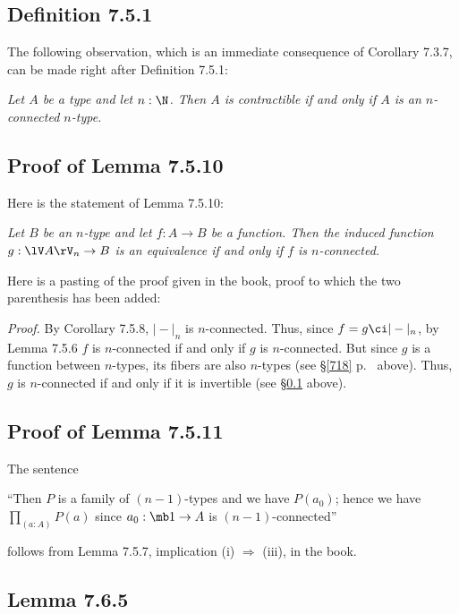 \documentclass[12pt]{article}
\begin{document}

\subsection{Definition 7.5.1}\label{751}

The following observation, which is an immediate consequence of Corollary 7.3.7, can be made right after Definition 7.5.1:

\nn\emph{Let $A$ be a type and let $n:\N$. Then $A$ is contractible if and only if $A$ is an $n$-connected $n$-type.}


\subsection{Proof of Lemma 7.5.10}

Here is the statement of Lemma 7.5.10:

\nn{} \emph{Let $B$ be an $n$-type and let $f:A\to B$ be a function. Then the induced function $g:\lV A\rV_n\to B$ is an equivalence if and only if $f$ is $n$-connected.}

Here is a pasting of the proof given in the book, proof to which the two parenthesis has been added: 

\nn\emph{Proof.} By Corollary 7.5.8, $\vert-\vert_n$ is $n$-connected. Thus, since $f=g\ci\vert-\vert_n$, by Lemma 7.5.6 $f$ is $n$-connected if and only if $g$ is $n$-connected. But since $g$ is a function between $n$-types, its fibers are also $n$-types (see \S\ref{718} p.~\pageref{718} above). Thus, $g$ is $n$-connected if and only if it is invertible (see \S\ref{751} above).


\subsection{Proof of Lemma 7.5.11}

The sentence 

\nn``Then $P$ is a family of $(n-1)$-types and we have $P(a_0)$; hence we have $\prod_{(a:A)}P(a)$ since $a_0:\mb1\to A$ is $(n-1)$-connected''

\nn follows from Lemma 7.5.7, implication (i) $\Rightarrow$ (iii), in the book.


\subsection{Lemma 7.6.5}
\end{document}
